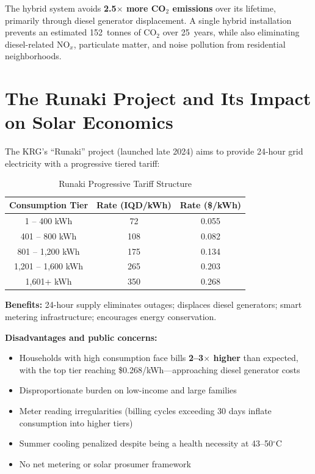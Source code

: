 The hybrid system avoids \textbf{2.5$\times$ more CO$_2$ emissions} over its lifetime, primarily through diesel generator displacement. A single hybrid installation prevents an estimated 152~tonnes of CO$_2$ over 25~years, while also eliminating diesel-related NO$_x$, particulate matter, and noise pollution from residential neighborhoods.


\section{The Runaki Project and Its Impact on Solar Economics}

The KRG's ``Runaki'' project (launched late 2024) aims to provide 24-hour grid electricity with a progressive tiered tariff:

\begin{table}[H]
\centering
\caption{Runaki Progressive Tariff Structure}
\label{tab:short_runaki}
\begin{tabular}{@{}c c c@{}}
\toprule
\textbf{Consumption Tier} & \textbf{Rate (IQD/kWh)} & \textbf{Rate (\$/kWh)} \\
\midrule
1 -- 400 kWh & 72 & 0.055 \\
401 -- 800 kWh & 108 & 0.082 \\
801 -- 1,200 kWh & 175 & 0.134 \\
1,201 -- 1,600 kWh & 265 & 0.203 \\
1,601+ kWh & 350 & 0.268 \\
\bottomrule
\end{tabular}
\end{table}

\textbf{Benefits:} 24-hour supply eliminates outages; displaces diesel generators; smart metering infrastructure; encourages energy conservation.

\textbf{Disadvantages and public concerns:}
\begin{itemize}
    \item Households with high consumption face bills \textbf{2--3$\times$ higher} than expected, with the top tier reaching \$0.268/kWh---approaching diesel generator costs
    \item Disproportionate burden on low-income and large families
    \item Meter reading irregularities (billing cycles exceeding 30 days inflate consumption into higher tiers)
    \item Summer cooling penalized despite being a health necessity at 43--50$^{\circ}$C
    \item No net metering or solar prosumer framework
\end{itemize}

